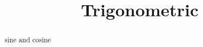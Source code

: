 \documentclass{ximera}
\title{Trigonometric}
\begin{document}
\begin{abstract}
sine and cosine
\end{abstract}
\maketitle
\end{document}
